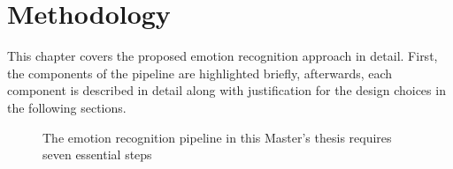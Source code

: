 \chapter{Methodology}
This chapter covers the proposed emotion recognition approach in detail. First, the components of the pipeline are highlighted briefly, afterwards, each component is described in detail along with justification for the design choices in the following sections. 

\begin{figure}[H]
  \begin{center}
  \caption{The emotion recognition pipeline in this Master's thesis requires seven essential steps}
  \label{fig:MachineLearningModelMethods}
  \end{center}
\end{figure}

